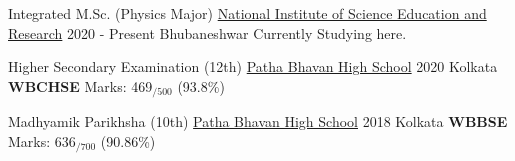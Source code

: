 
	\cvevent
	{Integrated M.Sc. (Physics Major)}
	{\href{https://www.niser.ac.in/}{National Institute of Science Education and Research}}
	{2020 - Present}
	{Bhubaneshwar}
	Currently Studying here.

	\divider

	\cvevent
	{Higher Secondary Examination (12th)}
	{\href{https://pathabhavan.org/}{Patha Bhavan High School}}
	{2020}
	{Kolkata}
	\textbf{WBCHSE} Marks: 469$_{/500}$ (93.8\%)

	\divider

	\cvevent
	{Madhyamik Parikhsha (10th)}
	{\href{https://pathabhavan.org/}{Patha Bhavan High School}}
	{2018}
	{Kolkata}
	\textbf{WBBSE} Marks: 636$_{/700}$ (90.86\%)

